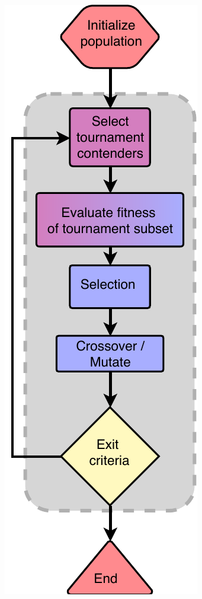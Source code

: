 \begin{figure}[ht]
\begin{subfigure}[ht]{0.25\linewidth}
    \end{subfigure}
    \hspace{0.25\textwidth}
    \begin{subfigure}[ht]{0.25\linewidth}
        \includegraphics[width=\linewidth]{Chapters/2.Background/figures/TS.pdf}

\end{subfigure}
\end{figure}
